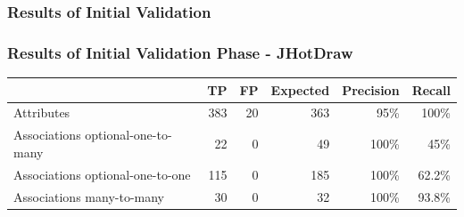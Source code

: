 \documentclass[xcolor=table]{beamer}
\begin{document}
\subsubsection{Results of Initial Validation}
\begin{frame}[fragile] 
\frametitle{Results of Initial Validation Phase - JHotDraw}

\begin{table}[h]
\centering 
\begin{tabular}{p{4cm}|rrrrr}
\toprule
\rowcolor[HTML]{BBDAFF}
\textbf{} & \textbf{TP}  & \textbf{FP} & \textbf{Expected} & \textbf{Precision}  & \textbf{Recall}\\ \hline
Attributes & 383  & 20  & 363  & 95\% & 100\% \\ \hline
Associations optional-one-to-many &  22 & 0 & 49 & 100\% & 45\% \\ \hline
Associations optional-one-to-one &  115 & 0 & 185  & 100\% & 62.2\% \\ \hline
Associations many-to-many & 30 & 0 & 32 & 100\% & 93.8\%\\ \bottomrule
\end{tabular}
\end{table}
\end{frame}
%
%
\end{document}
